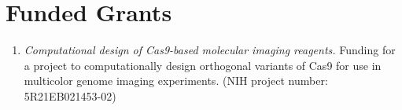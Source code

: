 \section{Funded Grants}

\begin{enumerate}

\item \emph{Computational design of Cas9-based molecular imaging reagents.} 
Funding for a project to computationally design orthogonal variants of Cas9 
for use in multicolor genome imaging experiments.  (NIH project number: 
5R21EB021453-02)

\end{enumerate}

